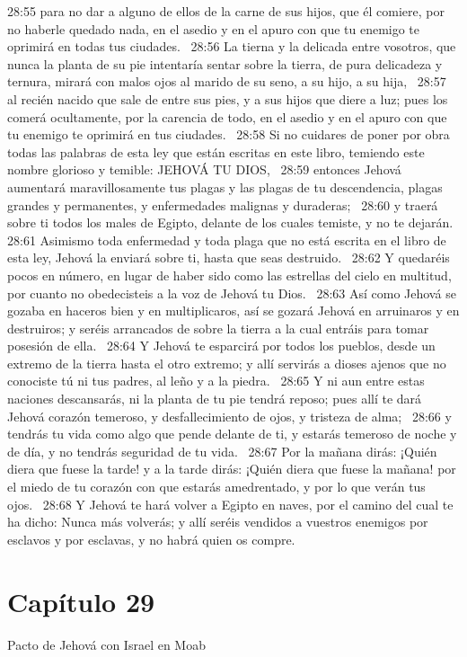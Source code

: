 28:55 para no dar a alguno de ellos de la carne de sus hijos, que él comiere, por no haberle quedado nada, en el asedio y en el apuro con que tu enemigo te oprimirá en todas tus ciudades.  
28:56 La tierna y la delicada entre vosotros, que nunca la planta de su pie intentaría sentar sobre la tierra, de pura delicadeza y ternura, mirará con malos ojos al marido de su seno, a su hijo, a su hija,  
28:57 al recién nacido que sale de entre sus pies, y a sus hijos que diere a luz; pues los comerá ocultamente, por la carencia de todo, en el asedio y en el apuro con que tu enemigo te oprimirá en tus ciudades.  
28:58 Si no cuidares de poner por obra todas las palabras de esta ley que están escritas en este libro, temiendo este nombre glorioso y temible: JEHOVÁ TU DIOS,  
28:59 entonces Jehová aumentará maravillosamente tus plagas y las plagas de tu descendencia, plagas grandes y permanentes, y enfermedades malignas y duraderas;  
28:60 y traerá sobre ti todos los males de Egipto, delante de los cuales temiste, y no te dejarán.  
28:61 Asimismo toda enfermedad y toda plaga que no está escrita en el libro de esta ley, Jehová la enviará sobre ti, hasta que seas destruido.  
28:62 Y quedaréis pocos en número, en lugar de haber sido como las estrellas del cielo en multitud, por cuanto no obedecisteis a la voz de Jehová tu Dios.  
28:63 Así como Jehová se gozaba en haceros bien y en multiplicaros, así se gozará Jehová en arruinaros y en destruiros; y seréis arrancados de sobre la tierra a la cual entráis para tomar posesión de ella.  
28:64 Y Jehová te esparcirá por todos los pueblos, desde un extremo de la tierra hasta el otro extremo; y allí servirás a dioses ajenos que no conociste tú ni tus padres, al leño y a la piedra.  
28:65 Y ni aun entre estas naciones descansarás, ni la planta de tu pie tendrá reposo; pues allí te dará Jehová corazón temeroso, y desfallecimiento de ojos, y tristeza de alma;  
28:66 y tendrás tu vida como algo que pende delante de ti, y estarás temeroso de noche y de día, y no tendrás seguridad de tu vida.  
28:67 Por la mañana dirás: ¡Quién diera que fuese la tarde! y a la tarde dirás: ¡Quién diera que fuese la mañana! por el miedo de tu corazón con que estarás amedrentado, y por lo que verán tus ojos.  
28:68 Y Jehová te hará volver a Egipto en naves, por el camino del cual te ha dicho: Nunca más volverás; y allí seréis vendidos a vuestros enemigos por esclavos y por esclavas, y no habrá quien os compre.  
\section*{Capítulo 29 }
Pacto de Jehová con Israel en Moab  

